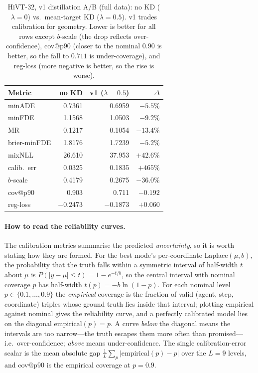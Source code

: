 \begin{table}[htbp]
  \centering
  \caption{HiVT-32, v1 distillation A/B (full data): no KD ($\lambda{=}0$) vs.\
    mean-target KD ($\lambda{=}0.5$). v1 trades calibration for geometry. Lower is
    better for all rows except $b$-scale (the drop reflects over-confidence),
    cov@p90 (closer to the nominal $0.90$ is better, so the fall to $0.711$ is
    under-coverage), and reg-loss (more negative is better, so the rise is worse).}
  \label{tab:ab32}
  \begin{tabular}{lrrr}
    \toprule
    Metric & no KD & v1 ($\lambda{=}0.5$) & $\Delta$ \\
    \midrule
    minADE        & 0.7361 & 0.6959 & $-5.5\%$ \\
    minFDE        & 1.1568 & 1.0503 & $-9.2\%$ \\
    MR            & 0.1217 & 0.1054 & $-13.4\%$ \\
    brier-minFDE  & 1.8176 & 1.7239 & $-5.2\%$ \\
    mixNLL        & 26.610 & 37.953 & $+42.6\%$ \\
    calib.\ err   & 0.0325 & 0.1835 & $+465\%$ \\
    $b$-scale     & 0.4179 & 0.2675 & $-36.0\%$ \\
    cov@p90       & 0.903  & 0.711  & $-0.192$ \\
    reg-loss      & $-0.2473$ & $-0.1873$ & $+0.060$ \\
    \bottomrule
  \end{tabular}
\end{table}

\paragraph{How to read the reliability curves.}
The calibration metrics summarise the predicted \emph{uncertainty}, so it is worth
stating how they are formed. For the best mode's per-coordinate Laplace$(\mu,b)$,
the probability that the truth falls within a symmetric interval of half-width $t$
about $\mu$ is $P(|y-\mu|\le t)=1-e^{-t/b}$, so the central interval with nominal
coverage $p$ has half-width $t(p)=-b\ln(1-p)$. For each nominal level
$p\in\{0.1,\dots,0.9\}$ the \emph{empirical} coverage is the fraction of valid
(agent, step, coordinate) triples whose ground truth lies inside that interval;
plotting empirical against nominal gives the reliability curve, and a perfectly
calibrated model lies on the diagonal $\mathrm{empirical}(p)=p$. A curve \emph{below}
the diagonal means the intervals are too narrow---the truth escapes them more often
than promised---i.e.\ over-confidence; \emph{above} means under-confidence. The
single calibration-error scalar is the mean absolute gap
$\tfrac1L\sum_p|\mathrm{empirical}(p)-p|$ over the $L{=}9$ levels, and cov@p90 is the
empirical coverage at $p{=}0.9$.

